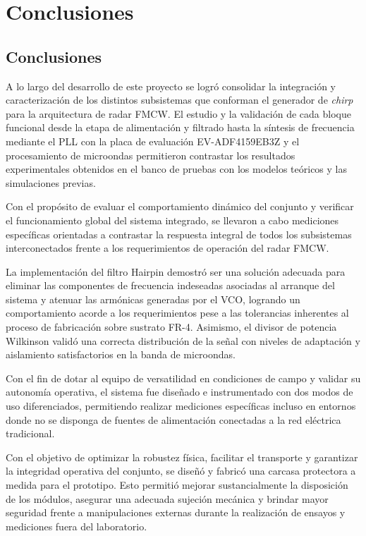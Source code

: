 \chapter*{Conclusiones }


\section*{Conclusiones}

A lo largo del desarrollo de este proyecto se logró consolidar la integración y caracterización de los distintos subsistemas que conforman el generador de \textit{chirp} para la arquitectura de radar FMCW. El estudio y la validación de cada bloque funcional desde la etapa de alimentación y filtrado hasta la síntesis de frecuencia mediante el PLL con la placa de evaluación EV-ADF4159EB3Z y el procesamiento de microondas permitieron contrastar los resultados experimentales obtenidos en el banco de pruebas con los modelos teóricos y las simulaciones previas.

Con el propósito de evaluar el comportamiento dinámico del conjunto y verificar el funcionamiento global del sistema integrado, se llevaron a cabo mediciones específicas orientadas a contrastar la respuesta integral de todos los subsistemas interconectados frente a los requerimientos de operación del radar FMCW.

La implementación del filtro Hairpin demostró ser una solución adecuada para eliminar las componentes de frecuencia indeseadas asociadas al arranque del sistema y atenuar las armónicas generadas por el VCO, logrando un comportamiento acorde a los requerimientos pese a las tolerancias inherentes al proceso de fabricación sobre sustrato FR-4. Asimismo, el divisor de potencia Wilkinson validó una correcta distribución de la señal con niveles de adaptación y aislamiento satisfactorios en la banda de microondas.

Con el fin de dotar al equipo de versatilidad en condiciones de campo y validar su autonomía operativa, el sistema fue diseñado e instrumentado con dos modos de uso diferenciados, permitiendo realizar mediciones específicas incluso en entornos donde no se disponga de fuentes de alimentación conectadas a la red eléctrica tradicional.

Con el objetivo de optimizar la robustez física, facilitar el transporte y garantizar la integridad operativa del conjunto, se diseñó y fabricó una carcasa protectora a medida para el prototipo. Esto permitió mejorar sustancialmente la disposición de los módulos, asegurar una adecuada sujeción mecánica y brindar mayor seguridad frente a manipulaciones externas durante la realización de ensayos y mediciones fuera del laboratorio.

